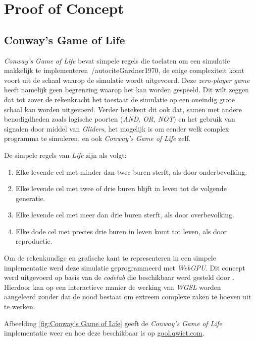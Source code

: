 \chapter{Proof of Concept}
\label{ch:poc}

\section{Conway's Game of Life}
\label{sec:gool}

\textit{Conway's Game of Life} bevat simpele regels die toelaten om een simulatie makkelijk te implementeren~/autocite{Gardner1970}, de enige complexiteit komt voort uit de schaal waarop de simulatie wordt uitgevoerd. Deze \textit{zero-player game} heeft namelijk geen begrenzing waarop het kan worden gespeeld. Dit wilt zeggen dat tot zover de rekenkracht het toestaat de simulatie op een oneindig grote schaal kan worden uitgevoerd. Verder betekent dit ook dat, samen met andere benodigdheden zoals logische poorten (\textit{AND, OR, NOT}) en het gebruik van signalen door middel van \textit{Gliders}, het mogelijk is om eender welk complex programma te simuleren, en ook \textit{Conway's Game of Life} zelf.

\bigbreak{}

De simpele regels van \textit{Life} zijn als volgt:
\begin{enumerate}
    \item Elke levende cel met minder dan twee buren sterft, als door onderbevolking.
    \item Elke levende cel met twee of drie buren blijft in leven tot de volgende generatie.
    \item Elke levende cel met meer dan drie buren sterft, als door overbevolking.
    \item Elke dode cel met precies drie buren in leven komt tot leven, als door reproductie.
\end{enumerate}

\break{}

Om de rekenkundige en grafische kant te representeren in een simpele implementatie werd deze simulatie geprogrammeerd met \textit{WebGPU}. Dit concept werd uitgevoerd op basis van de \textit{codelab} die beschikbaar werd gesteld door \textcite{google2023}. Hierdoor kan op een interactieve manier de werking van \textit{WGSL} worden aangeleerd zonder dat de nood bestaat om extreem complexe zaken te hoeven uit te werken.

\bigbreak{}

Afbeelding \ref{fig:Conway's Game of Life} geeft de \textit{Conway's Game of Life} implementatie weer en hoe deze beschikbaar is op \href{https://gool.qwict.com}{gool.qwict.com}.


